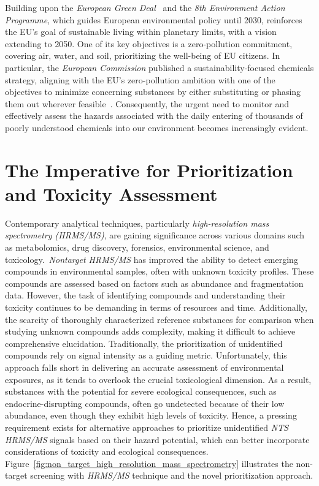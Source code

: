 Building upon the \emph{European Green Deal}~\cite{greendeal} and the \emph{8th Environment Action Programme}, which guides European environmental policy until 2030, reinforces the EU's goal of sustainable living within planetary limits, with a vision extending to 2050. One of its key objectives is a zero-pollution commitment, covering air, water, and soil, prioritizing the well-being of EU citizens. In particular, the \emph{European Commission} published a sustainability-focused chemicals strategy, aligning with the EU's zero-pollution ambition with one of the objectives to minimize concerning substances by either substituting or phasing them out wherever feasible~\cite{EUChemicalsStrategy}. 
Consequently, the urgent need to monitor and effectively assess the hazards associated with the daily entering of thousands of poorly understood chemicals into our environment becomes increasingly evident.

\section{The Imperative for Prioritization and Toxicity Assessment}

Contemporary analytical techniques, particularly \emph{high-resolution mass spectrometry (HRMS/MS)}, are gaining significance across various domains such as metabolomics, drug discovery, forensics, environmental science, and toxicology.~\emph{Nontarget HRMS/MS} has improved the ability to detect emerging compounds in environmental samples, often with unknown toxicity profiles. These compounds are assessed based on factors such as abundance and fragmentation data. However, the task of identifying compounds and understanding their toxicity continues to be demanding in terms of resources and time. Additionally, the scarcity of thoroughly characterized reference substances for comparison when studying unknown compounds adds complexity, making it difficult to achieve comprehensive elucidation. Traditionally, the prioritization of unidentified compounds rely on signal intensity as a guiding metric. Unfortunately, this approach falls short in delivering an accurate assessment of environmental exposures, as it tends to overlook the crucial toxicological dimension. As a result, substances with the potential for severe ecological consequences, such as endocrine-disrupting compounds, often go undetected because of their low abundance, even though they exhibit high levels of toxicity. Hence, a pressing requirement exists for alternative approaches to prioritize unidentified \emph{NTS HRMS/MS} signals based on their hazard potential, which can better incorporate considerations of toxicity and ecological consequences. Figure~\ref{fig:non_target_high_resolution_mass_spectrometry} illustrates the non-target screening with \emph{HRMS/MS} technique and the novel prioritization approach.

